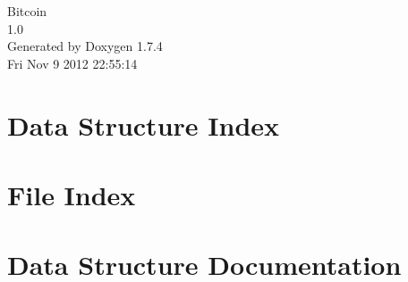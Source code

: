 \documentclass[a4paper]{book}
\begin{document}
\hypersetup{pageanchor=false}
\begin{titlepage}
\vspace*{7cm}
\begin{center}
{\Large Bitcoin \\[1ex]\large 1.0 }\\
\vspace*{1cm}
{\large Generated by Doxygen 1.7.4}\\
\vspace*{0.5cm}
{\small Fri Nov 9 2012 22:55:14}\\
\end{center}
\end{titlepage}
\clearemptydoublepage
{}
\tableofcontents
\clearemptydoublepage
{}
\hypersetup{pageanchor=true}
\chapter{Data Structure Index}

\chapter{File Index}

\chapter{Data Structure Documentation}






















































\end{document}
